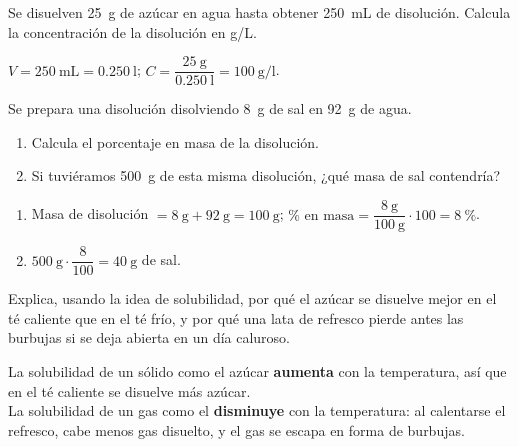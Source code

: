 \begin{exercise}
    Se disuelven \qty{25}{\g} de azúcar en agua hasta obtener \qty{250}{\mL} de disolución. Calcula la concentración de la disolución en g/L.
    \begin{solu}
        \(V = \qty{250}{\mL} = \qty{0.250}{\litre}\); \quad \(C = \dfrac{\qty{25}{\g}}{\qty{0.250}{\litre}} = \qty{100}{\g\per\litre}\).
    \end{solu}
\end{exercise}

\begin{exercise}
    Se prepara una disolución disolviendo \qty{8}{\g} de sal en \qty{92}{\g} de agua.
    \begin{enumerate}[label=\letraminuscula]
        \item Calcula el porcentaje en masa de la disolución.
        \item Si tuviéramos \qty{500}{\g} de esta misma disolución, ¿qué masa de sal contendría?
    \end{enumerate}
    \begin{solu}
        \begin{enumerate}[label=\alph*)]
            \item Masa de disolución \(= \qty{8}{\g} + \qty{92}{\g} = \qty{100}{\g}\); \quad \(\% \text{ en masa} = \dfrac{\qty{8}{\g}}{\qty{100}{\g}} \cdot 100 = \qty{8}{\percent}\).
            \item \(\qty{500}{\g} \cdot \dfrac{8}{100} = \qty{40}{\g}\) de sal.
        \end{enumerate}
    \end{solu}
\end{exercise}

\begin{exercise}
    Explica, usando la idea de solubilidad, por qué el azúcar se disuelve mejor en el té caliente que en el té frío, y por qué una lata de refresco pierde antes las burbujas si se deja abierta en un día caluroso.
    \begin{solu}
        La solubilidad de un sólido como el azúcar \textbf{aumenta} con la temperatura, así que en el té caliente se disuelve más azúcar. \\
        La solubilidad de un gas como el  \textbf{disminuye} con la temperatura: al calentarse el refresco, cabe menos gas disuelto, y el gas se escapa en forma de burbujas.
    \end{solu}
\end{exercise}

